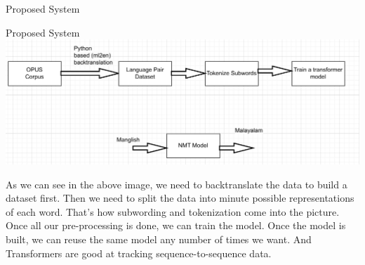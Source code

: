 \begin{chapter}{Proposed System}
\begin{section}{Proposed System}
    \includegraphics[width=\linewidth]{Images/proposed-system.png}

    As we can see in the above image, we need to backtranslate the data to build a dataset first. Then we need to split the data into minute possible representations of each word. That's how subwording and tokenization come into the picture. Once all our pre-processing is done, we can train the model. Once the model is built, we can reuse the same model any number of times we want. And Transformers are good at tracking sequence-to-sequence data.
    
    \end{section}


\end{chapter}
